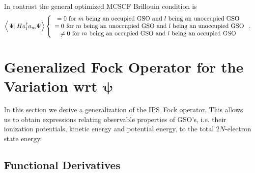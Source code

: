 \documentclass[aps,preprint]{revtex4}%
\begin{document}
In contrast the general optimized MCSCF Brillouin condition is
\begin{equation}
\left\langle \left.  \Psi\right\vert Ha_{l}^{\dagger}a_{m}\Psi\right\rangle
\left\{
\begin{array}
[c]{c}%
=0\text{ for }m\text{ being an occupied GSO and }l\text{ being an unoccupied
GSO }\\
=0\text{ for }m\text{ being an unoccupied GSO and }l\text{ being an unoccupied
GSO}\\
\neq0\text{ for }m\text{ being an occupied GSO and }l\text{ being an occupied
GSO }%
\end{array}
\right.  .
\end{equation}


\section{Generalized Fock Operator \label{Fock} for the Variation wrt
$\bm{\psi}$}

In this section we derive a generalization of the IPS\ Fock operator. This
allows us to obtain expressions relating observable properties of GSO's, i.e.
their ionization potentials, kinetic energy and potential energy, to the total
$2N$-electron state energy.

\subsection{Functional Derivatives\label{FD}}
\end{document}

